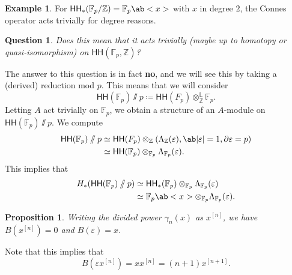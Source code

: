 \documentclass[10pt, oneside]{memoir}
\newtheorem{prop}[thm]{Proposition}
\newtheorem{quest}[thm]{Question}
\theoremstyle{definition}
\newtheorem{exm}[thm]{Example}
\theoremstyle{remark}
\theoremstyle{plain}
\theoremstyle{definition}
\theoremstyle{remark}
\newcommand{\Z}{\mathbb{Z}}
\newcommand{\F}{\mathbb{F}}
\renewcommand{\L}{\mathbb{L}}
\newcommand{\ep}{\varepsilon}
\newcommand{\ms}[1]{\mathsf{#1}}
\newcommand{\1}{\mathbf{1}}
\newcommand{\2}{\mathbf{2}}
\newcommand{\3}{\mathbf{3}}
\newcommand{\HH}{\ms{HH}}
\begin{document}
\begin{exm}
    For \(\HH_*(\F_p/\Z) = \F_p \ab<x> \) with \(x \) in degree \(2 \), the Connes operator acts trivially for degree reasons.
\end{exm}

\begin{quest}
    Does this mean that it acts trivially (maybe up to homotopy or quasi-isomorphism) on \(\HH(\F_p, \Z) \)?
\end{quest}

The answer to this question is in fact \textbf{no}, and we will see this by taking a (derived) reduction mod \(p \). This means that we will consider
\[ \HH(\F_p) \sslash p \coloneqq \HH(F_p) \otimes_{\Z}^{\L} \F_p. \]
Letting \(A \) act trivially on \(\F_p \), we obtain a structure of an \(A \)-module on \(\HH(\F_p) \sslash p \). We compute
\begin{align*}
    \HH(\F_p) \sslash p &\simeq \HH(F_p) \otimes_{\Z} (\Lambda_{\Z}(\ep), \ab|\ep| = 1, \partial \ep = p) \\
    &\simeq \HH(\F_p) \otimes_{\F_p} \Lambda_{\F_p}(\ep).
\end{align*}
This implies that
\begin{align*}
    H_* (\HH(\F_p) \sslash p) &\simeq \HH_*(\F_p) \otimes_{\F_p} \Lambda_{\F_p}(\ep) \\
    &\simeq \F_p \ab<x> \otimes_{\F_p} \Lambda_{\F_p}(\ep).
\end{align*}
\begin{prop}
    Writing the divided power \(\gamma_n(x) \) as \(x^{[n]} \), we have \(B(x^{[n]}) = 0 \) and \(B(\ep) = x \).
\end{prop}
Note that this implies that 
\[ B(\ep x^{[n]}) = x x^{[n]} = (n+1)x^{[n+1]}. \]
\end{document}
